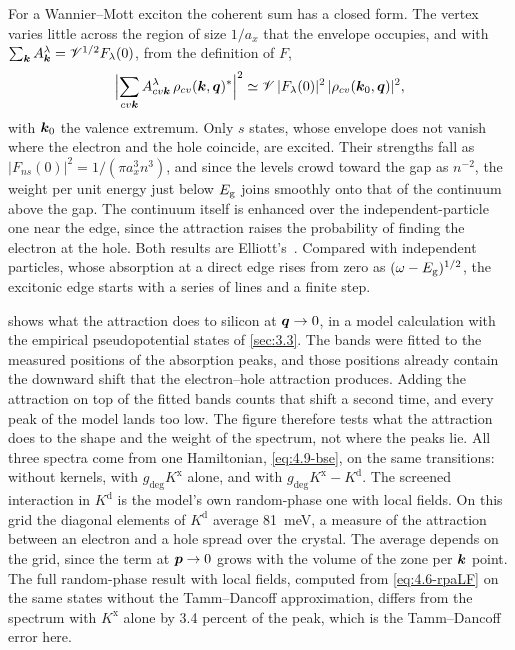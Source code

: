 For a Wannier--Mott exciton the coherent sum has a closed form. The vertex varies little across the region of size $1/a_x$ that the envelope occupies, and with $\sum_{\bm{k}}A^\lambda_{\bm{k}} = \mathscr{V}^{1/2}F_\lambda(0)$, from the definition of $F$,
\begin{equation}
  \Bigl|\sum_{cv\bm{k}}A^\lambda_{cv\bm{k}}\,\rho_{cv}(\bm{k},\bm{q})^*\Bigr|^2 \simeq \mathscr{V}\,|F_\lambda(0)|^2\,|\rho_{cv}(\bm{k}_0,\bm{q})|^2 ,
  \label{eq:4.9-elliott}
\end{equation}
with $\bm{k}_0$ the valence extremum. Only $s$ states, whose envelope does not vanish where the electron and the hole coincide, are excited. Their strengths fall as $|F_{ns}(0)|^2 = 1/(\pi a_x^3n^3)$, and since the levels crowd toward the gap as $n^{-2}$, the weight per unit energy just below $E_{\mathrm{g}}$ joins smoothly onto that of the continuum above the gap. The continuum itself is enhanced over the independent-particle one near the edge, since the attraction raises the probability of finding the electron at the hole. Both results are Elliott's~\cite{elliott1957intensity}. Compared with independent particles, whose absorption at a direct edge rises from zero as $(\omega - E_{\mathrm{g}})^{1/2}$, the excitonic edge starts with a series of lines and a finite step.

 shows what the attraction does to silicon at $\bm{q} \to 0$, in a model calculation with the empirical pseudopotential states of \cref{sec:3.3}. The bands were fitted to the measured positions of the absorption peaks, and those positions already contain the downward shift that the electron--hole attraction produces. Adding the attraction on top of the fitted bands counts that shift a second time, and every peak of the model lands too low. The figure therefore tests what the attraction does to the shape and the weight of the spectrum, not where the peaks lie. All three spectra come from one Hamiltonian, \cref{eq:4.9-bse}, on the same transitions: without kernels, with $g_{\mathrm{deg}}K^{\mathrm{x}}$ alone, and with $g_{\mathrm{deg}}K^{\mathrm{x}} - K^{\mathrm{d}}$. The screened interaction in $K^{\mathrm{d}}$ is the model's own random-phase one with local fields. On this grid the diagonal elements of $K^{\mathrm{d}}$ average \SI{81}{meV}, a measure of the attraction between an electron and a hole spread over the crystal. The average depends on the grid, since the term at $\bm{p} \to 0$ grows with the volume of the zone per $\bm{k}$ point. The full random-phase result with local fields, computed from \cref{eq:4.6-rpaLF} on the same states without the Tamm--Dancoff approximation, differs from the spectrum with $K^{\mathrm{x}}$ alone by 3.4 percent of the peak, which is the Tamm--Dancoff error here.

